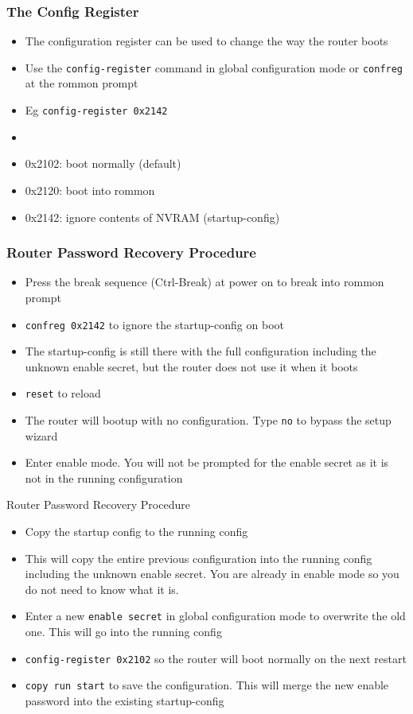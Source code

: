\documentclass[pdflatex,compress,mathserif]{beamer}
\begin{document}
\begin{frame}
	\frametitle{The Config Register}
	\begin{itemize}
		\item The configuration register can be used to change the way the router boots
		\item Use the \texttt{config-register} command in global configuration mode or \texttt{confreg} at the rommon prompt
		\item Eg \texttt{config-register 0x2142}
		\item[]
		\item 0x2102: boot normally (default)
		\item 0x2120: boot into rommon
		\item 0x2142: ignore contents of NVRAM (startup-config)
	\end{itemize}
\end{frame}

\begin{frame}
	\frametitle{Router Password Recovery Procedure}
	\begin{itemize}
		\item Press the break sequence (Ctrl-Break) at power on to break into rommon prompt
		\item \texttt{confreg 0x2142} to ignore the startup-config on boot
		\item The startup-config is still there with the full configuration including the unknown enable secret, but the router does not use it when it boots
		\item \texttt{reset} to reload
		\item The router will bootup with no configuration. Type \texttt{no} to bypass the setup wizard
		\item Enter enable mode. You will not be prompted for the enable secret as it is not in the running configuration
	\end{itemize}
\end{frame}

\begin{frame}{Router Password Recovery Procedure}
	\begin{itemize}
		\item Copy the startup config to the running config
		\item This will copy the entire previous configuration into the running config including the unknown enable secret. You are already in enable mode so you do not need to know what it is.
		\item Enter a new \texttt{enable secret} in global configuration mode to overwrite the old one. This will go into the running config
		\item \texttt{config-register 0x2102} so the router will boot normally on the next restart
		\item \texttt{copy run start} to save the configuration. This will merge the new enable password into the existing startup-config
	\end{itemize}
\end{frame}
\end{document}
